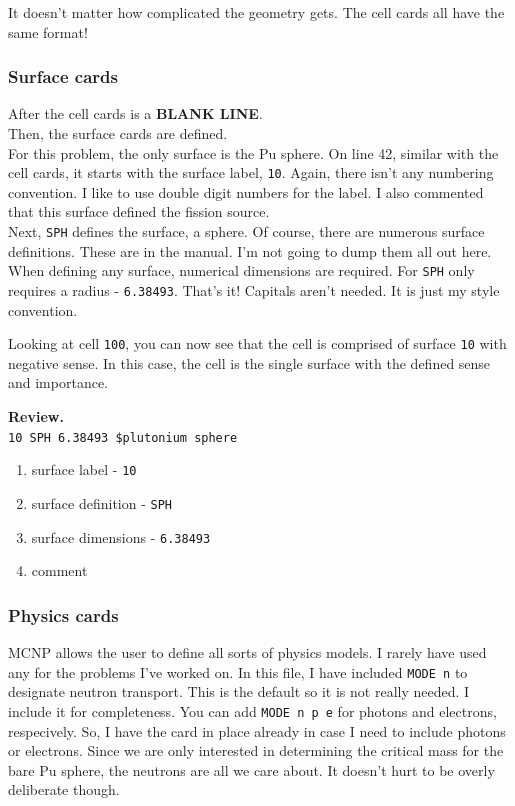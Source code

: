 \documentclass[11pt,a4paper]{article}
\begin{document}
\noindent It doesn't matter how complicated the geometry gets. The cell cards all have the same format!

\subsubsection{Surface cards}
\noindent After the cell cards is a \textbf{BLANK LINE}. \\

\noindent Then, the surface cards are defined.\\

\noindent For this problem, the only surface is the Pu sphere. On line 42, similar with the cell cards, it starts with the surface label, \texttt{10}. Again, there isn't any numbering convention. I like to use double digit numbers for the label. I also commented that this surface defined the fission source. \\

\noindent Next, \texttt{SPH} defines the surface, a sphere. Of course, there are numerous surface definitions. These are in the manual. I'm not going to dump them all out here. \\

\noindent When defining any surface, numerical dimensions are required. For \texttt{SPH} only requires a radius - \texttt{6.38493}. That's it! Capitals aren't needed. It is just my style convention. 

\noindent Looking at cell \texttt{100}, you can now see that the cell is comprised of surface \texttt{10} with negative sense. In this case, the cell is the single surface with the defined sense and importance.

\noindent\textbf{Review.}\\
\noindent\texttt{10     SPH  6.38493     \$plutonium sphere}\\

\begin{enumerate}[topsep=0pt,itemsep=-1ex,partopsep=1ex,parsep=1ex]
    \item surface label - \texttt{10}
    \item surface definition - \texttt{SPH}
    \item surface dimensions - \texttt{6.38493}
    \item comment
\end{enumerate}

\subsubsection{Physics cards}
\noindent MCNP allows the user to define all sorts of physics models. I rarely have used any for the problems I've worked on. In this file, I have included \texttt{MODE   n} to designate neutron transport. This is the default so it is not really needed. I include it for completeness. You can add \texttt{MODE   n p e} for photons and electrons, respecively. So, I have the card in place already in case I need to include photons or electrons. Since we are only interested in determining
the critical mass for the bare Pu sphere, the neutrons are all we care about. It doesn't hurt to be overly deliberate
though.
\end{document}

